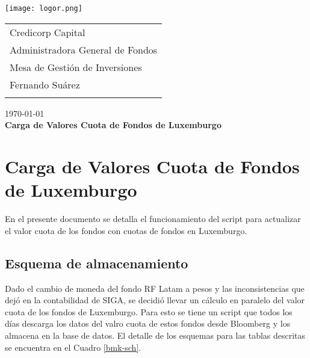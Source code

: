 \documentclass{article}
\begin{document}
\texttt{[image: logor.png]}
\vspace*{-1.55cm}

\hspace*{1.4 cm}
 \hspace*{2.9 cm}
 {\footnotesize
 \begin{tabular}{l}
  \sc Credicorp Capital\\
  \sc Administradora General de Fondos \\
  \sc Mesa de Gestión de Inversiones  \\
  \sc Fernando Suárez  \\
  \vspace{15\baselineskip}\mbox{}
  \vspace{-3mm}\mbox{}
 \end{tabular}
}

 \bigskip

\vspace*{5mm}
\begin{center}
{\today} \\
\vspace{3mm}
{\Large\bf Carga de Valores Cuota de Fondos de Luxemburgo} \\
\vspace{2mm}
\end{center}
\section{Carga de Valores Cuota de Fondos de Luxemburgo}


En el presente documento se detalla el funcionamiento del script para actualizar el valor cuota de los fondos con cuotas de fondos en Luxemburgo.


\subsection{Esquema de almacenamiento}


\par Dado el cambio de moneda del fondo RF Latam a pesos y las inconsistencias que dejó en la contabilidad de SIGA, se decidió llevar un cálculo en paralelo del valor cuota de los fondos de Luxemburgo. Para esto se tiene un script que todos los días descarga los datos del valro cuota de estos fondos desde Bloomberg y los almacena en la base de datos. El detalle de los esquemas para las tablas descritas se encuentra en el Cuadro \ref{bmk-sch}.
\end{document}
